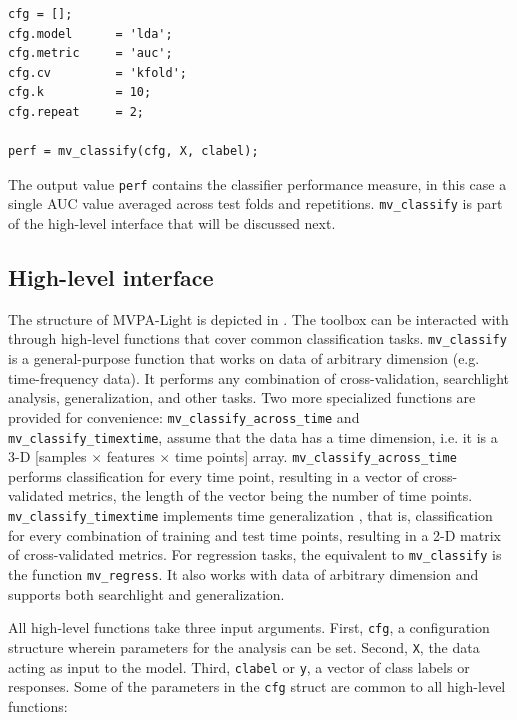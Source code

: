 \documentclass[utf8]{frontiersSCNS} %
\newcommand{\ttt}[1]{\texttt{#1}}
\begin{document}
\begin{verbatim}
cfg = [];
cfg.model      = 'lda';
cfg.metric     = 'auc';
cfg.cv         = 'kfold';
cfg.k          = 10;
cfg.repeat     = 2;

perf = mv_classify(cfg, X, clabel);
\end{verbatim}

The output value \ttt{perf} contains the classifier performance measure, in this case a single AUC value averaged across test folds and repetitions. \ttt{mv\_classify} is part of the high-level interface that will be discussed next.

\subsection{High-level interface}\label{sec:interface}

The structure of MVPA-Light is depicted in . The toolbox can be interacted with through high-level functions that cover common classification tasks. \ttt{mv\_classify} is a  general-purpose function that works on data of arbitrary dimension (e.g. time-frequency data). It performs any combination of cross-validation, searchlight analysis, generalization, and other tasks. Two more specialized functions are provided for convenience: \ttt{mv\_classify\_across\_time}  and \ttt{mv\_classify\_timextime}, assume that the data has a time dimension, i.e. it is a 3-D [samples $\times$ features $\times$ time points] array. \ttt{mv\_classify\_across\_time} performs classification for every time point, resulting in a vector of cross-validated metrics, the length of the vector being the number of time points. \ttt{mv\_classify\_timextime} implements time generalization \citep{King2014}, that is, classification for every combination of training and test time points, resulting in a 2-D matrix of cross-validated metrics. For regression tasks, the equivalent to \ttt{mv\_classify} is the function \ttt{mv\_regress}. It also works with data of arbitrary dimension and supports both searchlight and generalization.

All high-level functions take three input arguments. First, \ttt{cfg}, a configuration structure wherein parameters for the analysis can be set. Second, \ttt{X}, the data acting as input to the model. Third, \ttt{clabel} or \ttt{y}, a vector of class labels or responses. Some of the parameters in the \ttt{cfg} struct are common  to all high-level functions:
\end{document}
